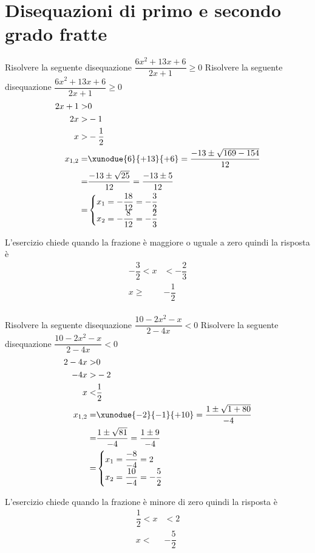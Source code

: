 \tcbstartrecording
\section{Disequazioni di primo e secondo grado fratte}
\begin{exercise}
		Risolvere la seguente disequazione $\dfrac{6x^2+13x+6}{2x+1}\geq0$
	\tcblower
	Risolvere la seguente disequazione $\dfrac{6x^2+13x+6}{2x+1}\geq0$
	\begin{align*}
	2x+1>&0\\
	2x>&-1\\
	x>&-\dfrac{1}{2}\\
	x_{1,2}=&\xunodue{6}{+13}{+6}=\dfrac{-13\pm\sqrt{169-154}}{12}\\
	=&\dfrac{-13\pm\sqrt{25}}{12}=\dfrac{-13\pm 5}{12}\\
	=&\begin{cases}
	x_1=-\dfrac{18}{12}=-\dfrac{3}{2}\\
	x_2=-\dfrac{8}{12}=-\dfrac{2}{3}
	\end{cases}\\
	\end{align*}
	\begin{center}
		
	\end{center}
L'esercizio chiede quando la frazione è maggiore o uguale a zero quindi la risposta è 
\begin{align*}
-\dfrac{3}{2}<x&< -\dfrac{2}{3}\\ x\geq&-\dfrac{1}{2}\\
\end{align*}
\end{exercise}
\begin{exercise}
		Risolvere la seguente disequazione $\dfrac{10-2x^2-x}{2-4x}< 0$
	\tcblower
	Risolvere la seguente disequazione $\dfrac{10-2x^2-x}{2-4x}< 0$
	\begin{align*}
		2-4x>&0\\
		-4x>&-2\\
		x<&\dfrac{1}{2}\\
		x_{1,2}=&\xunodue{-2}{-1}{+10}=\dfrac{1\pm\sqrt{1+80}}{-4}\\
		=&\dfrac{1\pm\sqrt{81}}{-4}=\dfrac{1\pm 9}{-4}\\
		=&\begin{cases}
			x_1=\dfrac{-8}{-4}=2\\
			x_2=\dfrac{10}{-4}=-\dfrac{5}{2}
		\end{cases}\\
	\end{align*}
	\begin{center}
		
	\end{center}
	L'esercizio chiede quando la frazione è minore di zero quindi la risposta è 
	\begin{align*}
		\dfrac{1}{2}<x&<2\\ x<&-\dfrac{5}{2}\\
	\end{align*}
\end{exercise}
